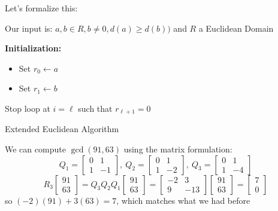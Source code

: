 Let's formalize this:

\IncMargin{1em}
\begin{algorithm}[H]
    Our input is: $a,b \in R, b \neq 0, d(a) \geq d(b))$ and $R$ a Euclidean Domain

    \nl \textbf{Initialization:}
    \begin{itemize}
        \item Set $r_0 \leftarrow a$
        \item Set $r_1 \leftarrow b$
    \end{itemize}

    \nl {}
    
    \nl Stop loop at $i = \ell$ such that $r_{\ell + 1} = 0$

    \caption{Extended Euclidean Algorithm}
\end{algorithm}

\begin{example}{}{}
    We can compute $\gcd(91,63)$ using the matrix formulation:
    \[
    Q_1 =
    \begin{bmatrix}
        0 & 1\\
        1 & -1
    \end{bmatrix}, \
    Q_2 =
    \begin{bmatrix}
        0 & 1\\
        1 & -2
    \end{bmatrix}, \
    Q_3 =
    \begin{bmatrix}
        0 & 1\\
        1 & -4
    \end{bmatrix}
    \]
    \[
    R_3 
    \begin{bmatrix}
        91 \\ 63
    \end{bmatrix} 
    = 
    Q_3Q_2Q_1
    \begin{bmatrix}
        91 \\ 63
    \end{bmatrix}
    = 
    \begin{bmatrix}
        -2 & 3\\
        9 & -13
    \end{bmatrix}
    \begin{bmatrix}
        91 \\ 63
    \end{bmatrix}
    =
    \begin{bmatrix}
        7 \\ 0
    \end{bmatrix}
    \]
    so $(-2)(91) + 3(63) = 7$, which matches what we had before
\end{example}

